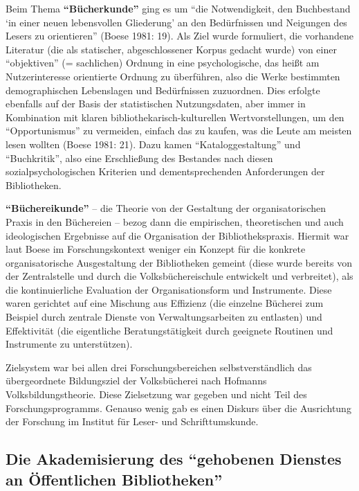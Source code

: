 \documentclass[a4paper,
fontsize=11pt,
oneside,
numbers=noperiodatend,
parskip=half-,
bibliography=totoc,
final
]{scrartcl}
\begin{document}
Beim Thema \textbf{\enquote{Bücherkunde}} ging es um \enquote{die
Notwendigkeit, den Buchbestand \enquote{in einer neuen lebensvollen
Gliederung} an den Bedürfnissen und Neigungen des Lesers zu orientieren}
(Boese 1981: 19). Als Ziel wurde formuliert, die vorhandene Literatur
(die als statischer, abgeschlossener Korpus gedacht wurde) von einer
\enquote{objektiven} (= sachlichen) Ordnung in eine psychologische, das
heißt am Nutzerinteresse orientierte Ordnung zu überführen, also die
Werke bestimmten demographischen Lebenslagen und Bedürfnissen
zuzuordnen. Dies erfolgte ebenfalls auf der Basis der statistischen
Nutzungsdaten, aber immer in Kombination mit klaren
bibliothekarisch-kulturellen Wertvorstellungen, um den
\enquote{Opportunismus} zu vermeiden, einfach das zu kaufen, was die
Leute am meisten lesen wollten (Boese 1981: 21). Dazu kamen
\enquote{Kataloggestaltung} und \enquote{Buchkritik}, also eine
Erschließung des Bestandes nach diesen sozialpsychologischen Kriterien
und dementsprechenden Anforderungen der Bibliotheken.

\textbf{\enquote{Büchereikunde}} -- die Theorie von der Gestaltung der
organisatorischen Praxis in den Büchereien -- bezog dann die
empirischen, theoretischen und auch ideologischen Ergebnisse auf die
Organisation der Bibliothekspraxis. Hiermit war laut Boese im
Forschungskontext weniger ein Konzept für die konkrete organisatorische
Ausgestaltung der Bibliotheken gemeint (diese wurde bereits von der
Zentralstelle und durch die Volksbüchereischule entwickelt und
verbreitet), als die kontinuierliche Evaluation der Organisationsform
und Instrumente. Diese waren gerichtet auf eine Mischung aus Effizienz
(die einzelne Bücherei zum Beispiel durch zentrale Dienste von
Verwaltungsarbeiten zu entlasten) und Effektivität (die eigentliche
Beratungstätigkeit durch geeignete Routinen und Instrumente zu
unterstützen).

Zielsystem war bei allen drei Forschungsbereichen selbstverständlich das
übergeordnete Bildungsziel der Volksbücherei nach Hofmanns
Volksbildungstheorie. Diese Zielsetzung war gegeben und nicht Teil des
Forschungsprogramms. Genauso wenig gab es einen Diskurs über die
Ausrichtung der Forschung im Institut für Leser- und Schrifttumskunde.

\hypertarget{die-akademisierung-des-gehobenen-dienstes-an-uxf6ffentlichen-bibliotheken}{%
\subsection{\texorpdfstring{Die Akademisierung des \enquote{gehobenen
Dienstes an Öffentlichen
Bibliotheken}}{2. Die Akademisierung des ``gehobenen Dienstes an Öffentlichen Bibliotheken''}}\label{die-akademisierung-des-gehobenen-dienstes-an-uxf6ffentlichen-bibliotheken}}
\end{document}
